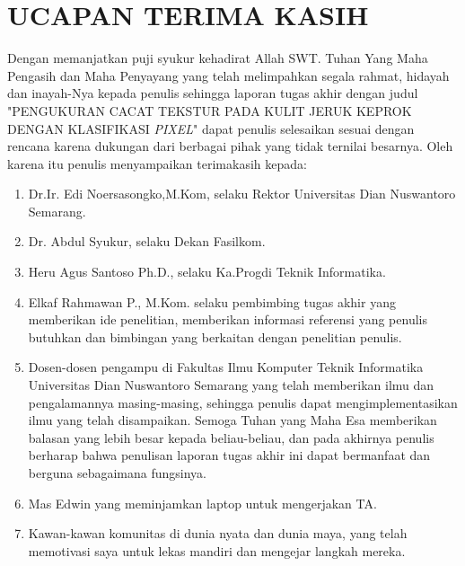 \documentclass[laporan.tex]{subfiles}
\begin{document}
\chapter*{UCAPAN TERIMA KASIH}

Dengan memanjatkan puji syukur kehadirat Allah SWT. Tuhan Yang Maha Pengasih dan Maha Penyayang yang telah melimpahkan segala rahmat, hidayah dan inayah-Nya kepada penulis sehingga laporan tugas akhir dengan judul "PENGUKURAN CACAT TEKSTUR PADA KULIT JERUK KEPROK DENGAN KLASIFIKASI \emph{PIXEL}" dapat penulis selesaikan sesuai dengan rencana karena dukungan dari berbagai pihak yang tidak ternilai besarnya. Oleh karena itu penulis menyampaikan terimakasih \mbox{kepada}:
\begin{enumerate}
\item Dr.Ir. Edi Noersasongko,M.Kom, selaku Rektor Universitas Dian Nuswantoro Semarang.
\item Dr. Abdul Syukur, selaku Dekan Fasilkom.
\item Heru Agus Santoso Ph.D., selaku Ka.Progdi Teknik Informatika.
\item Elkaf Rahmawan P., M.Kom. selaku pembimbing tugas akhir yang memberikan ide penelitian, memberikan informasi referensi yang penulis butuhkan dan bimbingan yang berkaitan dengan penelitian penulis.
\item Dosen-dosen pengampu di Fakultas Ilmu Komputer Teknik Informatika Universitas Dian Nuswantoro Semarang yang telah memberikan ilmu dan pengalamannya masing-masing, sehingga penulis dapat mengimplementasikan ilmu yang telah disampaikan. Semoga Tuhan yang Maha Esa memberikan balasan yang lebih besar kepada beliau-beliau, dan pada akhirnya penulis berharap bahwa penulisan laporan tugas akhir ini dapat bermanfaat dan berguna sebagaimana fungsinya.
\item Mas Edwin yang meminjamkan laptop untuk mengerjakan TA.
\item Kawan-kawan komunitas di dunia nyata dan dunia maya, yang telah memotivasi saya untuk lekas mandiri dan mengejar langkah mereka.
\end{enumerate}
\end{document}

